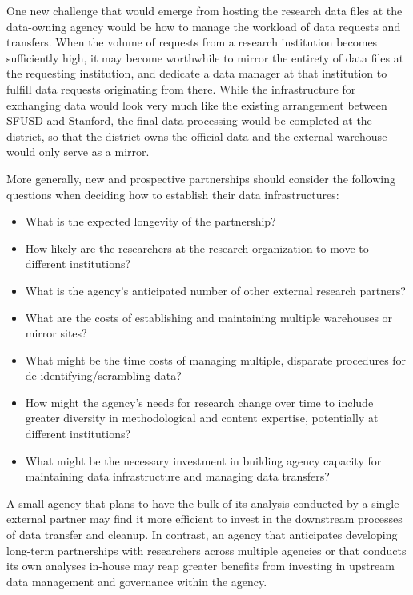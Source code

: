 \documentclass[
]{WileySix}
\providecommand{\tightlist}{%
  \setlength{\itemsep}{0pt}\setlength{\parskip}{0pt}}
\begin{document}
One new challenge that would emerge from hosting the research data files at the data-owning agency would be how to manage the workload of data requests and transfers. When the volume of requests from a research institution becomes sufficiently high, it may become worthwhile to mirror the entirety of data files at the requesting institution, and dedicate a data manager at that institution to fulfill data requests originating from there. While the infrastructure for exchanging data would look very much like the existing arrangement between SFUSD and Stanford, the final data processing would be completed at the district, so that the district owns the official data and the external warehouse would only serve as a mirror.

More generally, new and prospective partnerships should consider the following questions when deciding how to establish their data infrastructures:

\begin{itemize}
\tightlist
\item
  What is the expected longevity of the partnership?
\item
  How likely are the researchers at the research organization to move to different institutions?
\item
  What is the agency's anticipated number of other external research partners?
\item
  What are the costs of establishing and maintaining multiple warehouses or mirror sites?
\item
  What might be the time costs of managing multiple, disparate procedures for de-identifying/scrambling data?
\item
  How might the agency's needs for research change over time to include greater diversity in methodological and content expertise, potentially at different institutions?
\item
  What might be the necessary investment in building agency capacity for maintaining data infrastructure and managing data transfers?
\end{itemize}

A small agency that plans to have the bulk of its analysis conducted by a single external partner may find it more efficient to invest in the downstream processes of data transfer and cleanup. In contrast, an agency that anticipates developing long-term partnerships with researchers across multiple agencies or that conducts its own analyses in-house may reap greater benefits from investing in upstream data management and governance within the agency.
\end{document}
